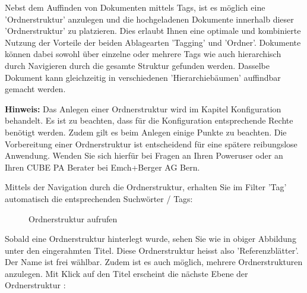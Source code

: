 Nebst dem Auffinden von Dokumenten mittels Tags, ist es möglich eine 'Ordnerstruktur' anzulegen und die hochgeladenen Dokumente innerhalb dieser 'Ordnerstruktur' zu platzieren. Dies erlaubt Ihnen eine optimale und kombinierte Nutzung der Vorteile der beiden Ablagearten 'Tagging' und 'Ordner'. Dokumente können dabei sowohl über einzelne oder mehrere Tags wie auch hierarchisch durch Navigieren durch die gesamte Struktur gefunden werden. Dasselbe Dokument kann gleichzeitig in verschiedenen 'Hierarchiebäumen' auffindbar gemacht werden.

\vspace{\baselineskip}

\textbf{Hinweis:} Das Anlegen einer Ordnerstruktur wird im Kapitel Konfiguration behandelt. Es ist zu beachten, dass für die Konfiguration entsprechende Rechte benötigt werden. Zudem gilt es beim Anlegen einige Punkte zu beachten. Die Vorbereitung einer Ordnerstruktur ist entscheidend für eine spätere reibungslose Anwendung. Wenden Sie sich hierfür bei Fragen an Ihren Poweruser oder an Ihren CUBE PA Berater bei Emch+Berger AG Bern.

\vspace{\baselineskip}

Mittels der Navigation durch die Ordnerstruktur, erhalten Sie im Filter 'Tag' automatisch die entsprechenden Suchwörter / Tags:

\begin{figure}[H]
\caption{Ordnerstruktur aufrufen}
\end{figure}

Sobald eine Ordnerstruktur hinterlegt wurde, sehen Sie wie in obiger Abbildung unter  den eingerahmten Titel. Diese Ordnerstruktur heisst also 'Referenzblätter'. Der Name ist frei wählbar. Zudem ist es auch möglich, mehrere Ordnerstrukturen anzulegen. Mit Klick auf den Titel erscheint die nächste Ebene der Ordnerstruktur :

